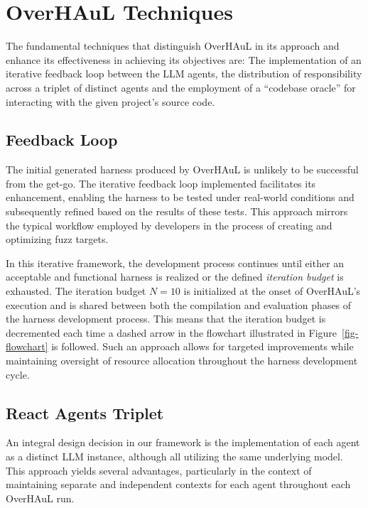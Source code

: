\documentclass[
  a4paper,
]{scrreprt}
\theoremstyle{definition}
\theoremstyle{remark}
\begin{document}
\section{OverHAuL Techniques}\label{sec-techniques}

The fundamental techniques that distinguish OverHAuL in its approach and
enhance its effectiveness in achieving its objectives are: The
implementation of an iterative feedback loop between the LLM agents, the
distribution of responsibility across a triplet of distinct agents and
the employment of a ``codebase oracle'' for interacting with the given
project's source code.

\subsection{Feedback Loop}\label{sec-loop}

The initial generated harness produced by OverHAuL is unlikely to be
successful from the get-go. The iterative feedback loop implemented
facilitates its enhancement, enabling the harness to be tested under
real-world conditions and subsequently refined based on the results of
these tests. This approach mirrors the typical workflow employed by
developers in the process of creating and optimizing fuzz targets.

In this iterative framework, the development process continues until
either an acceptable and functional harness is realized or the defined
\emph{iteration budget} is exhausted. The iteration budget \(N=10\) is
initialized at the onset of OverHAuL's execution and is shared between
both the compilation and evaluation phases of the harness development
process. This means that the iteration budget is decremented each time a
dashed arrow in the flowchart illustrated in Figure~\ref{fig-flowchart}
is followed. Such an approach allows for targeted improvements while
maintaining oversight of resource allocation throughout the harness
development cycle.

\subsection{React Agents Triplet}\label{react-agents-triplet}

An integral design decision in our framework is the implementation of
each agent as a distinct LLM instance, although all utilizing the same
underlying model. This approach yields several advantages, particularly
in the context of maintaining separate and independent contexts for each
agent throughout each OverHAuL run.
\end{document}
